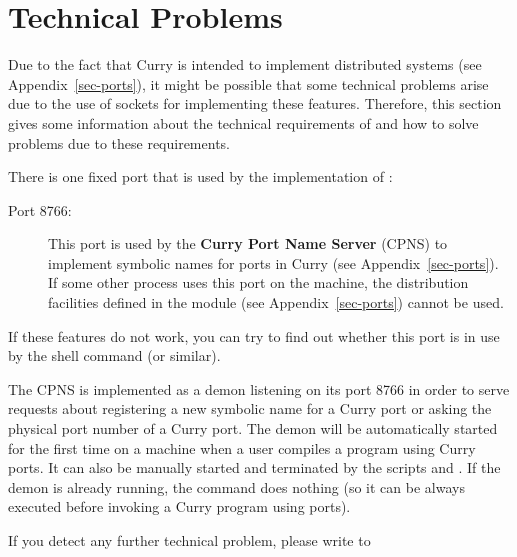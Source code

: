 \section{Technical Problems}

Due to the fact that Curry is intended to implement
distributed systems (see Appendix~\ref{sec-ports}),
it might be possible that some technical problems
arise due to the use of sockets for implementing these
features. Therefore, this section gives some information
about the technical requirements of \CYS and how to solve
problems due to these requirements.

There is one fixed port that is used by the implementation of \CYS:
\begin{description}
\item[Port 8766:] This port is used by the
{\bf Curry Port Name Server} (CPNS) to implement symbolic names for
ports in Curry (see Appendix~\ref{sec-ports}).
If some other process uses this port on the machine,
the distribution facilities defined in the module 
(see Appendix~\ref{sec-ports}) cannot be used.
\end{description}
If these features do not work, you can try to find out
whether this port is in use by the shell command
 (or similar).

The CPNS is implemented as a demon listening on its port 8766
in order to serve requests about registering a new symbolic
name for a Curry port or asking the physical port number
of a Curry port. The demon will be automatically started for
the first time on a machine when a user compiles a program
using Curry ports. It can also be manually started and terminated by the
scripts  and
.
If the demon is already running, the command
does nothing (so it can be always executed
before invoking a Curry program using ports).

If you detect any further technical problem,
please write to
\begin{center}
\end{center}

